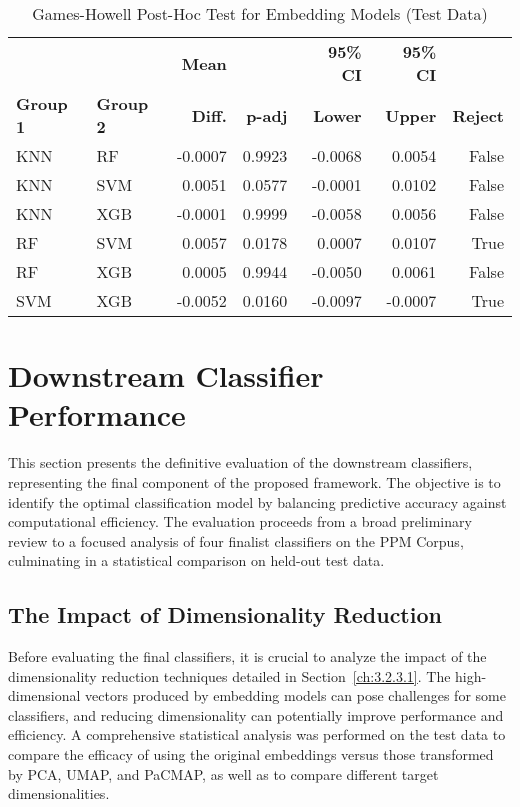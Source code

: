 \begin{table}[tb]
    \captionsetup{skip=5pt}
\centering
\caption{Games-Howell Post-Hoc Test for Embedding Models (Test Data)}
\label{tbl:games_howell_embedding_model}
        \begin{tabular}{llrrrrr}
            \toprule
             &  & \textbf{Mean} &  & \textbf{95\% CI} & \textbf{95\% CI} & \\
            \textbf{Group 1} & \textbf{Group 2} & \textbf{Diff.} & \textbf{p-adj} & \textbf{Lower} & \textbf{Upper} & \textbf{Reject}\\
\midrule
KNN & RF & -0.0007 & 0.9923 & -0.0068 & 0.0054 & False \\
KNN & SVM & 0.0051 & 0.0577 & -0.0001 & 0.0102 & False \\
KNN & XGB & -0.0001 & 0.9999 & -0.0058 & 0.0056 & False \\
RF & SVM & 0.0057 & 0.0178 & 0.0007 & 0.0107 & True \\
RF & XGB & 0.0005 & 0.9944 & -0.0050 & 0.0061 & False \\
SVM & XGB & -0.0052 & 0.0160 & -0.0097 & -0.0007 & True \\
\bottomrule
\end{tabular}
\end{table}

\section{Downstream Classifier Performance}\label{ch:4.5}
This section presents the definitive evaluation of the downstream classifiers, representing the final component of the proposed framework. The objective is to identify the optimal classification model by balancing predictive accuracy against computational efficiency. The evaluation proceeds from a broad preliminary review to a focused analysis of four finalist classifiers on the PPM Corpus, culminating in a statistical comparison on held-out test data.

\subsection{The Impact of Dimensionality Reduction}\label{ch:4.5.1}
Before evaluating the final classifiers, it is crucial to analyze the impact of the dimensionality reduction techniques detailed in Section~\ref{ch:3.2.3.1}. The high-dimensional vectors produced by embedding models can pose challenges for some classifiers, and reducing dimensionality can potentially improve performance and efficiency. A comprehensive statistical analysis was performed on the test data to compare the efficacy of using the original embeddings versus those transformed by PCA, UMAP, and PaCMAP, as well as to compare different target dimensionalities.

